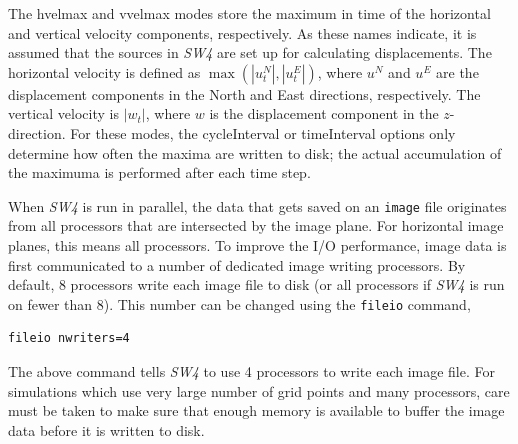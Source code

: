 \documentclass[11pt]{report}
\begin{document}
The hvelmax and vvelmax modes store the maximum in time of the horizontal and vertical velocity
components, respectively. As these names indicate, it is assumed that the sources in \emph{SW4} are
set up for calculating displacements. The horizontal velocity is defined as $\max(|u^N_t|,|u^E_t|)$,
where $u^N$ and $u^E$ are the displacement components in the North and East directions,
respectively. The vertical velocity is $|w_t|$, where $w$ is the displacement component in the
$z$-direction. For these modes, the cycleInterval or timeInterval options only determine how often
the maxima are written to disk; the actual accumulation of the maximuma is performed after each time
step.

When \emph{SW4} is run in parallel, the data that gets saved on an {\tt image} file originates from
all processors that are intersected by the image plane. For horizontal image planes, this means all
processors. To improve the I/O performance, image data is first communicated to a number of
dedicated image writing processors. By default, 8 processors write each image file to disk (or all
processors if \emph{SW4} is run on fewer than 8). This number can be changed using the {\tt fileio}
command,
\begin{verbatim}
fileio nwriters=4
\end{verbatim}
The above command tells \emph{SW4} to use 4 processors to write each image file. For simulations
which use very large number of grid points and many processors, care must be taken to make sure that
enough memory is available to buffer the image data before it is written to disk.
\end{document}
